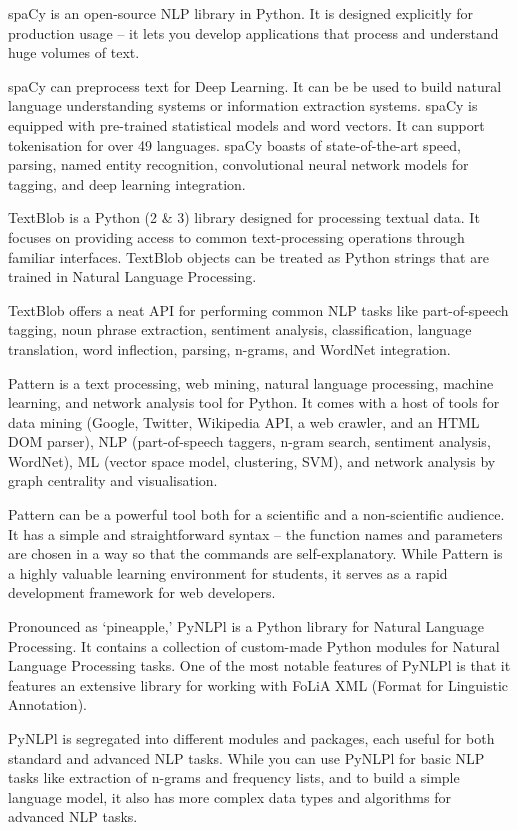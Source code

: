 	spaCy is an open-source NLP library in Python. It is designed explicitly for production usage – it lets you develop applications that process and understand huge volumes of text. 
	
	spaCy can preprocess text for Deep Learning. It can be be used to build natural language understanding systems or information extraction systems. spaCy is equipped with pre-trained statistical models and word vectors. It can support tokenisation for over 49 languages. spaCy boasts of state-of-the-art speed, parsing, named entity recognition, convolutional neural network models for tagging, and deep learning integration.
	
	TextBlob is a Python (2 \& 3) library designed for processing textual data. It focuses on providing access to common text-processing operations through familiar interfaces. TextBlob objects can be treated as Python strings that are trained in Natural Language Processing.
	
	TextBlob offers a neat API for performing common NLP tasks like part-of-speech tagging, noun phrase extraction, sentiment analysis, classification, language translation, word inflection, parsing, n-grams, and WordNet integration.
	
	Pattern is a text processing, web mining, natural language processing, machine learning, and network analysis tool for Python. It comes with a host of tools for data mining (Google, Twitter, Wikipedia API, a web crawler, and an HTML DOM parser), NLP (part-of-speech taggers, n-gram search, sentiment analysis, WordNet), ML (vector space model, clustering, SVM), and network analysis by graph centrality and visualisation. 
	
	Pattern can be a powerful tool both for a scientific and a non-scientific audience. It has a simple and straightforward syntax – the function names and parameters are chosen in a way so that the commands are self-explanatory. While Pattern is a highly valuable learning environment for students, it serves as a rapid development framework for web developers.
	
	Pronounced as ‘pineapple,’ PyNLPl is a Python library for Natural Language Processing. It contains a collection of custom-made Python modules for Natural Language Processing tasks. One of the most notable features of PyNLPl is that it features an extensive library for working with FoLiA XML (Format for Linguistic Annotation).
	
	PyNLPl is segregated into different modules and packages, each useful for both standard and advanced NLP tasks. While you can use PyNLPl for basic NLP tasks like extraction of n-grams and frequency lists, and to build a simple language model, it also has more complex data types and algorithms for advanced NLP tasks. 
	
